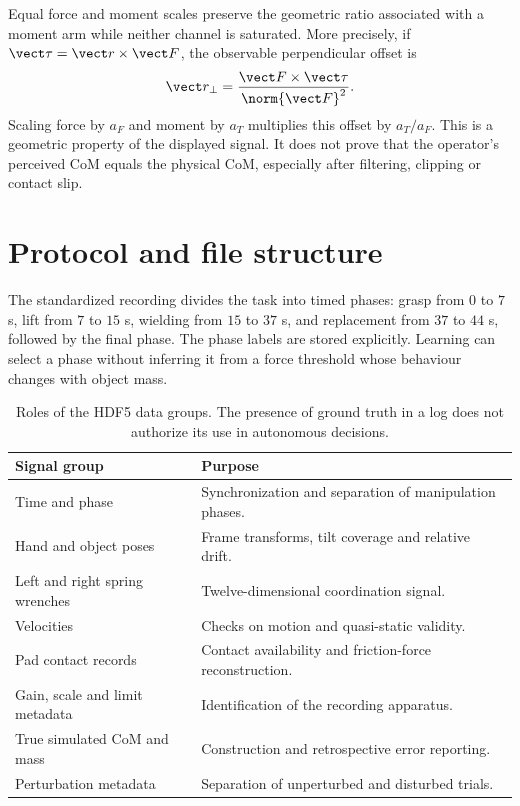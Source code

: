Equal force and moment scales preserve the geometric ratio associated with a moment arm while neither channel is saturated. More precisely, if $\vect\tau=\vect r\times\vect F$, the observable perpendicular offset is
\begin{equation}
\vect r_\perp=\frac{\vect F\times\vect\tau}{\norm{\vect F}^2}.
\end{equation}
Scaling force by $a_F$ and moment by $a_T$ multiplies this offset by $a_T/a_F$. This is a geometric property of the displayed signal. It does not prove that the operator's perceived CoM equals the physical CoM, especially after filtering, clipping or contact slip.

\section{Protocol and file structure}

The standardized recording divides the task into timed phases: grasp from $0$ to $7$ s, lift from $7$ to $15$ s, wielding from $15$ to $37$ s, and replacement from $37$ to $44$ s, followed by the final phase. The phase labels are stored explicitly. Learning can select a phase without inferring it from a force threshold whose behaviour changes with object mass.

\begin{table}[htbp]\centering\small
\begin{tabular}{@{}lp{}@{}}\toprule
Signal group & Purpose \\\midrule
Time and phase & Synchronization and separation of manipulation phases.\\
Hand and object poses & Frame transforms, tilt coverage and relative drift.\\
Left and right spring wrenches & Twelve-dimensional coordination signal.\\
Velocities & Checks on motion and quasi-static validity.\\
Pad contact records & Contact availability and friction-force reconstruction.\\
Gain, scale and limit metadata & Identification of the recording apparatus.\\
True simulated CoM and mass & Construction and retrospective error reporting.\\
Perturbation metadata & Separation of unperturbed and disturbed trials.\\
\bottomrule\end{tabular}
\caption{Roles of the HDF5 data groups. The presence of ground truth in a log does not authorize its use in autonomous decisions.}
\label{tab:hdf5}
\end{table}

